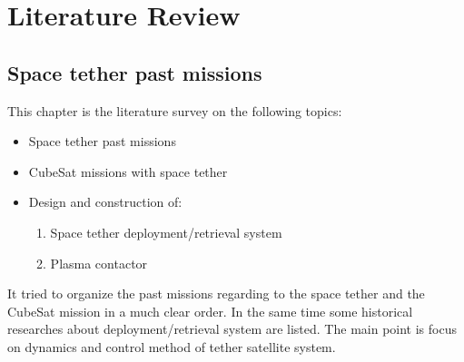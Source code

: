 \chapter{Literature Review}\label{sec-literature}
\section{Space tether past missions}
This chapter is the literature survey\cite{chen2013history,chen2014dynamical} on the following topics:
\begin{itemize}
\item Space tether past missions
\item CubeSat missions with space tether
\item Design and construction of:
\begin{enumerate}
\item Space tether deployment/retrieval system
\item Plasma contactor
\end{enumerate}
\end{itemize}

It tried to organize the past missions regarding to the space tether and the CubeSat mission in a much clear order. In the same time some historical researches about deployment/retrieval system are listed. The main point is focus on dynamics and control method of tether satellite system.
